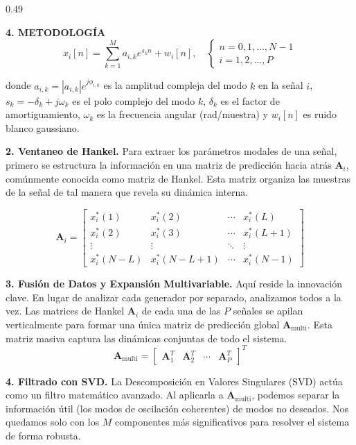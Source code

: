 \documentclass[final]{beamer}
\begin{document}
\begin{frame}[t]
\begin{columns}[t,totalwidth=\textwidth]
\begin{column}{0.49\textwidth}
\begin{block}{\textbf{4. METODOLOGÍA}}
\begin{equation}
x_i[n] = \sum_{k=1}^{M} a_{i,k} e^{s_k n} + w_i[n], \quad 
\begin{cases}
n = 0,1,\ldots,N-1 \\
i = 1,2,\ldots,P
\end{cases}
\label{eq:signal_model}
\end{equation}

donde $a_{i,k} = |a_{i,k}| e^{j\phi_{i,k}}$ es la amplitud compleja del 
modo $k$ en la señal $i$, $s_k = -\delta_k + j\omega_k$ es el polo complejo del 
modo $k$, $\delta_k $ es el factor de amortiguamiento, $\omega_k$ es la frecuencia 
angular (rad/muestra) y $w_i[n]$ es ruido blanco gaussiano.

    \textbf{2. Ventaneo de Hankel.}
    Para extraer los parámetros modales de una señal, primero se estructura la 
    información en una matriz de predicción hacia atrás $\mathbf{A}_i$, comúnmente 
    conocida como matriz de Hankel. Esta matriz organiza las muestras de la señal de 
    tal manera que revela su dinámica interna.
    
\begin{equation}
\mathbf{A}_i = 
\begin{bmatrix}
x_i^*(1) & x_i^*(2) & \cdots & x_i^*(L) \\
x_i^*(2) & x_i^*(3) & \cdots & x_i^*(L+1) \\
\vdots & \vdots & \ddots & \vdots \\
x_i^*(N-L) & x_i^*(N-L+1) & \cdots & x_i^*(N-1)
\end{bmatrix}
\label{eq:A_matrix}
\end{equation}

    \textbf{3. Fusión de Datos y Expansión Multivariable.}
    Aquí reside la innovación clave. En lugar de analizar cada generador por separado,
     analizamos todos a la vez. Las matrices de Hankel $\mathbf{A}_i$ de cada una de 
     las $P$ señales se apilan verticalmente para formar una única matriz de 
     predicción global $\mathbf{A}_{\text{multi}}$. Esta matriz masiva captura las 
     dinámicas conjuntas de todo el sistema.
    \begin{equation}
        \mathbf{A}_{\text{multi}} = 
        \begin{bmatrix}
        \mathbf{A}_1^T & \mathbf{A}_2^T & \cdots & \mathbf{A}_P^T
        \end{bmatrix}^T
    \end{equation}
    
    \textbf{4. Filtrado con SVD.}
    La Descomposición en Valores Singulares (SVD) actúa como un filtro matemático avanzado. Al aplicarla a 
    $\mathbf{A}_{\text{multi}}$, podemos separar la información útil (los modos de oscilación
     coherentes) de modos no deseados. Nos quedamos solo con 
     los $M$ componentes más significativos para resolver el sistema de forma robusta.
    

\end{block}
\end{column}
\end{columns}
\end{frame}
\end{document}
